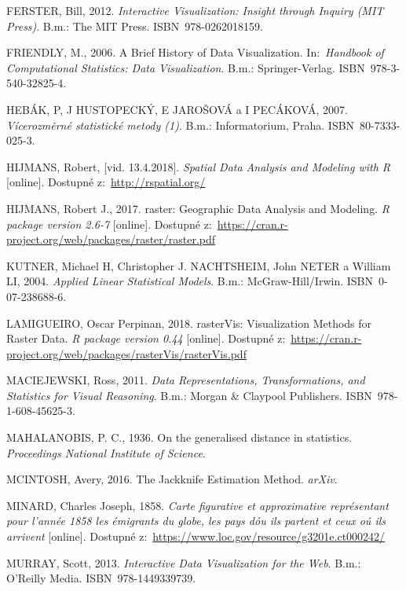 \documentclass[12pt,]{article}
\begin{document}
\hypertarget{ref-ferster}{}
FERSTER, Bill, 2012. \emph{Interactive Visualization: Insight through
Inquiry (MIT Press)}. B.m.: The MIT Press. ISBN~978-0262018159.

\hypertarget{ref-dataviz_history}{}
FRIENDLY, M., 2006. A Brief History of Data Visualization.
In:~\emph{Handbook of Computational Statistics: Data Visualization}.
B.m.: Springer-Verlag. ISBN~978-3-540-32825-4.

\hypertarget{ref-vicerozm_stat}{}
HEBÁK, P, J HUSTOPECKÝ, E JAROŠOVÁ a I PECÁKOVÁ, 2007.
\emph{Vícerozměrné statistické metody (1)}. B.m.: Informatorium, Praha.
ISBN~80-7333-025-3.

\hypertarget{ref-spatial2}{}
HIJMANS, Robert, {[}vid. 13.4.2018{]}. \emph{Spatial Data Analysis and
Modeling with R} {[}online{]}. Dostupné z:~\url{http://rspatial.org/}

\hypertarget{ref-raster}{}
HIJMANS, Robert J., 2017. raster: Geographic Data Analysis and Modeling.
\emph{R package version 2.6-7} {[}online{]}. Dostupné
z:~\url{https://cran.r-project.org/web/packages/raster/raster.pdf}

\hypertarget{ref-kutner_transform}{}
KUTNER, Michael H, Christopher J. NACHTSHEIM, John NETER a William LI,
2004. \emph{Applied Linear Statistical Models}. B.m.: McGraw-Hill/Irwin.
ISBN~0-07-238688-6.

\hypertarget{ref-rasterVis}{}
LAMIGUEIRO, Oscar Perpinan, 2018. rasterVis: Visualization Methods for
Raster Data. \emph{R package version 0.44} {[}online{]}. Dostupné
z:~\url{https://cran.r-project.org/web/packages/rasterVis/rasterVis.pdf}

\hypertarget{ref-datarep2011}{}
MACIEJEWSKI, Ross, 2011. \emph{Data Representations, Transformations,
and Statistics for Visual Reasoning}. B.m.: Morgan \& Claypool
Publishers. ISBN~978-1-608-45625-3.

\hypertarget{ref-mbdist}{}
MAHALANOBIS, P. C., 1936. On the generalised distance in statistics.
\emph{Proceedings National Institute of Science}.

\hypertarget{ref-mcintosh2016}{}
MCINTOSH, Avery, 2016. The Jackknife Estimation Method. \emph{arXiv}.

\hypertarget{ref-minard1858}{}
MINARD, Charles Joseph, 1858. \emph{Carte figurative et approximative
représentant pour l'année 1858 les émigrants du globe, les pays dóu ils
partent et ceux oú ils arrivent} {[}online{]}. Dostupné
z:~\url{https://www.loc.gov/resource/g3201e.ct000242/}

\hypertarget{ref-murray}{}
MURRAY, Scott, 2013. \emph{Interactive Data Visualization for the Web}.
B.m.: O'Reilly Media. ISBN~978-1449339739.
\end{document}
